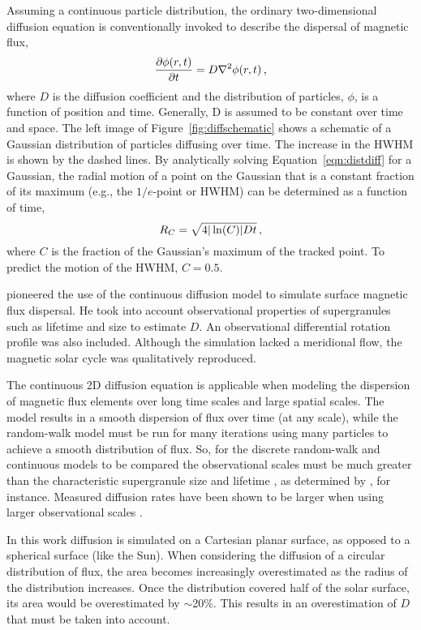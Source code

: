 Assuming a continuous particle distribution, the ordinary two-dimensional diffusion equation is conventionally invoked to describe the dispersal of magnetic flux,
\begin{equation}\label{eqn:distdiff}
\frac{\partial \phi(r,t)}{\partial t} = D\nabla^2\phi(r,t) \mbox{\,,}
\end{equation}
where $D$ is the diffusion coefficient and the distribution of particles, $\phi$, is a function of position and time. Generally, D is assumed to be constant over time and space. %
The left image of Figure~\ref{fig:diffschematic} shows a schematic of a Gaussian distribution of particles diffusing over time. The increase in the \gls{HWHM} is shown by the dashed lines. By analytically solving Equation~\ref{eqn:distdiff} for a Gaussian, the radial motion of a point on the Gaussian that is a constant fraction of its maximum (e.g., the $1/e$-point or \gls{HWHM}) can be determined as a function of time,
\begin{equation}\label{eqn:hwhm}
R_{C} = \sqrt{4 |\ln(C)| D t} \mbox{\,,}
\end{equation}
where $C$ is the fraction of the Gaussian's maximum of the tracked point. To predict the motion of the \gls{HWHM}, $C = 0.5$.

\cite{Leighton:1964} pioneered the use of the continuous diffusion model to simulate surface magnetic flux dispersal. He took into account observational properties of supergranules such as  lifetime and size to estimate $D$. An observational differential rotation profile was also included. Although the simulation lacked a meridional flow, the magnetic solar cycle was qualitatively reproduced. 

The continuous 2D diffusion equation is applicable when modeling the dispersion of magnetic flux elements over long time scales and large spatial scales. The model results in a smooth dispersion of flux over time (at any scale), while the random-walk model must be run for many iterations using many particles to achieve a smooth distribution of flux. So, for the discrete random-walk and continuous models to be compared the observational scales must be much greater than the characteristic supergranule size and lifetime \citep{Sheeley:1992}, as determined by \cite{Schrijver:1997a}, for instance. 
Measured diffusion rates have been shown to be larger when using larger observational scales \citep{Hagenaar:1999}.

In this work diffusion is simulated on a Cartesian planar surface, as opposed to a spherical surface (like the Sun). When considering the diffusion of a circular distribution of flux, the area becomes increasingly overestimated as the radius of the distribution increases. Once the distribution covered half of the solar surface, its area would be overestimated by $\sim$20\%. This results in an overestimation of $D$ that must be taken into account.

